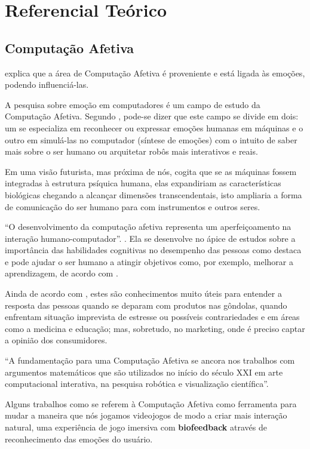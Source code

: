 \documentclass[
	12pt,				    %
	openright,			    %
	oneside,			    %
	a4paper,			    %
    sumario=tradicional,    %
	english,			    %
	brazil,				    %
	]{abntex2}              %
\begin{document}
\chapter{Referencial Teórico}\label{sec:RefTeorico}
\section{Computação Afetiva}

 explica que a área de Computação Afetiva é proveniente e está ligada às emoções, podendo influenciá-las. 

A pesquisa sobre emoção em computadores é um campo de estudo da Computação Afetiva. Segundo , pode-se dizer que este campo se divide em dois: um se especializa em reconhecer ou expressar emoções humanas em máquinas e o outro em simulá-las no computador (síntese de emoções) com o intuito de saber mais sobre o ser humano ou arquitetar robôs mais interativos e reais. 

Em uma visão futurista, mas próxima de nós,  cogita que se as máquinas fossem integradas à estrutura psíquica humana, elas expandiriam as características biológicas chegando a alcançar dimensões transcendentais, isto ampliaria a forma de comunicação do ser humano para com instrumentos e outros seres. 

``O desenvolvimento da computação afetiva representa um aperfeiçoamento na interação humano-computador''. \cite{amadeu2humano}. Ela se desenvolve no ápice de estudos sobre a importância das habilidades cognitivas no desempenho das pessoas como destaca  e pode ajudar o ser humano a atingir objetivos como, por exemplo, melhorar a aprendizagem, de acordo com .

Ainda de acordo com , estes são conhecimentos muito úteis para entender a resposta das pessoas quando se deparam com produtos nas gôndolas, quando enfrentam situação imprevista de estresse ou possíveis contrariedades e em áreas como a medicina e educação; mas, sobretudo, no marketing, onde é preciso captar a opinião dos consumidores.

``A fundamentação para uma Computação Afetiva se ancora nos trabalhos com argumentos matemáticos que são utilizados no início do século XXI em arte computacional interativa, na pesquisa robótica e visualização científica''.\cite{Louro2014}

Alguns trabalhos como  se referem à Computação Afetiva como ferramenta para mudar a maneira que nós jogamos videojogos de modo a criar mais interação natural, uma experiência de jogo imersiva com \textbf{biofeedback} através de reconhecimento das emoções do usuário.
\end{document}
